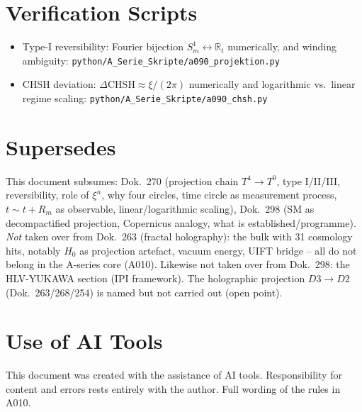\section{Verification Scripts}

\begin{itemize}[leftmargin=2em,itemsep=2pt,topsep=2pt]
  \item Type-I reversibility: Fourier bijection $S^1_m\leftrightarrow\mathbb{R}_t$
    numerically, and winding ambiguity:
    \texttt{python/A\_Serie\_Skripte/a090\_projektion.py}
  \item CHSH deviation: $\Delta\text{CHSH}\approx\xi/(2\pi)$ numerically and
    logarithmic vs.\ linear regime scaling:
    \texttt{python/A\_Serie\_Skripte/a090\_chsh.py}
\end{itemize}

\section{Supersedes}

This document subsumes: Dok.~270 (projection chain $T^4\to T^0$, type I/II/III,
reversibility, role of $\xi^n$, why four circles, time circle as measurement
process, $t\sim t+R_m$ as observable, linear/logarithmic scaling), Dok.~298 (SM
as decompactified projection, Copernicus analogy, what is established/programme).
\emph{Not} taken over from Dok.~263 (fractal holography): the bulk with 31
cosmology hits, notably $H_0$ as projection artefact, vacuum energy, UIFT bridge
-- all do not belong in the A-series core (A010). Likewise not taken over from
Dok.~298: the HLV-YUKAWA section (IPI framework). The holographic projection
$D3\to D2$ (Dok.~263/268/254) is named but not carried out (open point).

\section{Use of AI Tools}

This document was created with the assistance of AI tools.
Responsibility for content and errors rests entirely with the author.
Full wording of the rules in A010.

